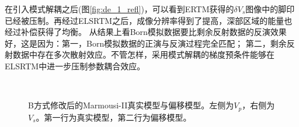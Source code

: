 在引入模式解耦之后(图\ref{fig:de_1_refl})，可以看到ERTM获得的$\delta
V_s$图像中的脚印已经被压制。再经过ELSRTM之后，成像分辨率得到了提高，深部区域的能量也经过补偿获得了均衡。
从结果上看Born模拟数据要比剩余反射数据的反演效果好，这是因为：第一，Born模拟数据的正演与反演过程完全匹配；
第二，剩余反射数据中存在多次散射效应。不管怎样，采用模式解耦的梯度预条件能够在ELSRTM中进一步压制参数耦合效应。
\begin{figure}[!hbt]
   \centering
   \\
   \caption{B方式修改后的Marmousi-II真实模型与偏移模型。左侧为$V_p$，右侧为$V_s$。第一行为真实模型，第二行为偏移模型。}
   \label{fig:TrueAndInitial_2}
\end{figure}

